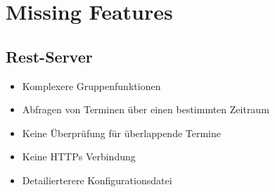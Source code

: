 \documentclass[12pt]{scrartcl}
\begin{document}
    \section{Missing Features}
    \subsection{Rest-Server}
    \begin{itemize}
        \item Komplexere Gruppenfunktionen
        \item Abfragen von Terminen über einen bestimmten Zeitraum 
        \item Keine Überprüfung für überlappende Termine 
        \item Keine HTTPs Verbindung 
        \item Detailierterere Konfigurationsdatei
    \end{itemize}


\end{document}
